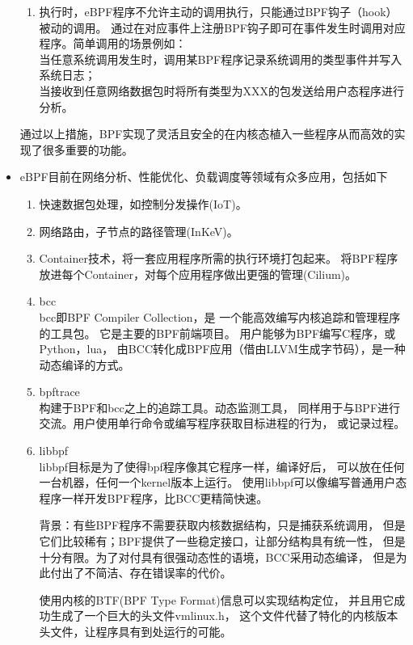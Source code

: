 \documentclass[AutoFakeBold,a4paper]{ctexart}
\begin{document}
\begin{itemize}
\begin{enumerate}
        \item 执行时，eBPF程序不允许主动的调用执行，只能通过BPF钩子（hook）被动的调用。
        通过在对应事件上注册BPF钩子即可在事件发生时调用对应程序。简单调用的场景例如：\\
        当任意系统调用发生时，调用某BPF程序记录系统调用的类型事件并写入系统日志；\\
        当接收到任意网络数据包时将所有类型为XXX的包发送给用户态程序进行分析。
    \end{enumerate}
    通过以上措施，BPF实现了灵活且安全的在内核态植入一些程序从而高效的实现了很多重要的功能。

    \item eBPF目前在网络分析、性能优化、负载调度等领域有众多应用，包括如下
    \begin{enumerate}
        \item 快速数据包处理，如控制分发操作(IoT)。
        \item 网络路由，子节点的路径管理(InKeV)。
        \item Container技术，将一套应用程序所需的执行环境打包起来。
        将BPF程序放进每个Container，对每个应用程序做出更强的管理(Cilium)。
        \item bcc\cite{bcc2021}\\
        bcc即BPF Compiler Collection，是
        一个能高效编写内核追踪和管理程序的工具包。
        它是主要的BPF前端项目。
        用户能够为BPF编写C程序，或Python，lua，
        由BCC转化成BPF应用（借由LLVM生成字节码），是一种动态编译的方式。
        \item bpftrace\cite{bpftrace2021}\\
        构建于BPF和bcc之上的追踪工具。动态监测工具，
        同样用于与BPF进行交流。用户使用单行命令或编写程序获取目标进程的行为，
        或记录过程。
        \item libbpf\cite{BPFPort2020}\\
        libbpf目标是为了使得bpf程序像其它程序一样，编译好后，
        可以放在任何一台机器，任何一个kernel版本上运行。
        使用libbpf可以像编写普通用户态程序一样开发BPF程序，比BCC更精简快速。

        背景：有些BPF程序不需要获取内核数据结构，只是捕获系统调用，
        但是它们比较稀有；BPF提供了一些稳定接口，让部分结构具有统一性，
        但是十分有限。为了对付具有很强动态性的语境，BCC采用动态编译，
        但是为此付出了不简洁、存在错误率的代价。

        使用内核的BTF(BPF Type Format)信息可以实现结构定位，
        并且用它成功生成了一个巨大的头文件vmlinux.h，
        这个文件代替了特化的内核版本头文件，让程序具有到处运行的可能。


\end{enumerate}
\end{itemize}
\end{document}
